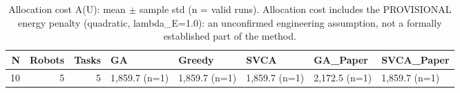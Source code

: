 \begin{table}[htbp]
\centering
\small
\caption{Allocation cost A(U): mean $\pm$ sample std (n = valid runs). Allocation cost includes the PROVISIONAL energy penalty (quadratic, lambda\_E=1.0): an unconfirmed engineering assumption, not a formally established part of the method.}
\label{tab:research_smoke_c1_r1_20261122_allocation_cost}
\begin{tabular}{rrrlllll}
\hline
N & Robots & Tasks & GA & Greedy & SVCA & GA\_Paper & SVCA\_Paper \\
\hline
10 & 5 & 5 & 1,859.7 (n=1) & 1,859.7 (n=1) & 1,859.7 (n=1) & 2,172.5 (n=1) & 1,859.7 (n=1) \\
\hline
\end{tabular}
\end{table}
